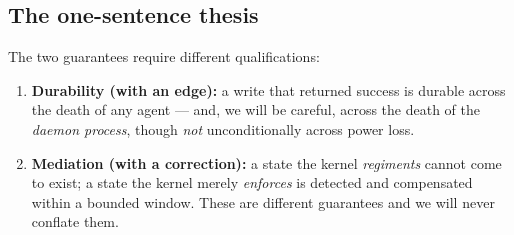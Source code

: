 \documentclass[11pt,a4paper]{article}
\theoremstyle{definition}
\theoremstyle{remark}
\begin{document}
\subsection{The one-sentence thesis}
The two guarantees require different qualifications:
\begin{enumerate}[leftmargin=1.4em]
  \item \textbf{Durability (with an edge):} a write that returned success is
  durable across the death of any agent --- and, we will be careful, across the
  death of the \emph{daemon process}, though \emph{not} unconditionally across
  power loss.
  \item \textbf{Mediation (with a correction):} a state the kernel \emph{regiments}
  cannot come to exist; a state the kernel merely \emph{enforces} is detected and
  compensated within a bounded window. These are different guarantees and we will
  never conflate them.
\end{enumerate}

\ifdefined\pdswisslandmarkplate
\begin{figure}[p]
  \centering
\end{figure}
\fi
\end{document}
